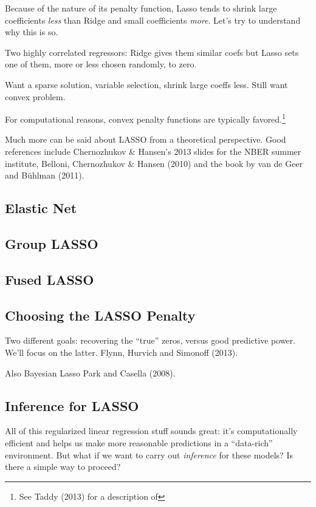 \documentclass[12pt]{article}
\theoremstyle{definition}
\begin{document}
Because of the nature of its penalty function, Lasso tends to shrink large coefficients \emph{less} than Ridge and small coefficients \emph{more}. Let's try to understand why this is so.


Two highly correlated regressors: Ridge gives them similar coefs but Lasso sets one of them, more or less chosen randomly, to zero.

Want a sparse solution, variable selection, shrink large coeffs less. Still want convex problem.

For computational reasons, convex penalty functions are typically favored.\footnote{See Taddy (2013) for a description of }

Much more can be said about LASSO from a theoretical perspective. Good references include Chernozhukov \& Hansen's 2013 slides for the NBER summer institute, Belloni, Chernozhukov \& Hansen (2010) and the book by van de Geer and B\"{u}hlman (2011).



\subsection{Elastic Net}

\subsection{Group LASSO}

\subsection{Fused LASSO}

\subsection{Choosing the LASSO Penalty}
Two different goals: recovering the ``true'' zeros, versus good predictive power. We'll focus on the latter.
Flynn, Hurvich and Simonoff (2013).

Also Bayesian Lasso Park and Casella (2008).

\subsection{Inference for LASSO}
All of this regularized linear regression stuff sounds great: it's computationally efficient and helps us make more reasonable predictions in a ``data-rich'' environment. But what if we want to carry out \emph{inference} for these models? Is there a simple way to proceed? 
\end{document}
